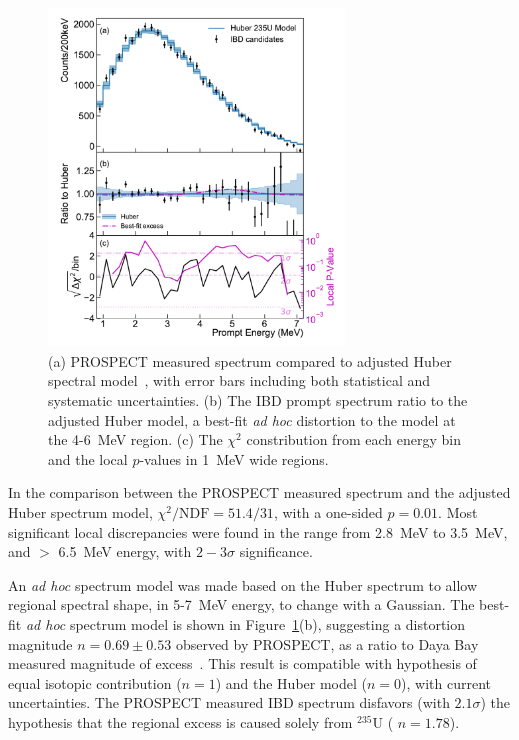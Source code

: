 \begin{figure}[h!]
    \centering
    \includegraphics[width=0.7\textwidth]{Figures/CombinedComparison.pdf}
    \caption[PROSPECT measured spectrum compared to adjusted Huber spectral model]{
    (a) PROSPECT measured spectrum compared to adjusted Huber spectral model~\cite{bib:prospect_spec}, with error bars including both statistical and systematic uncertainties.
    (b) The IBD prompt spectrum ratio to the adjusted Huber model, a best-fit \textit{ad hoc} distortion to the model at the 4-6~MeV region.
    (c) The $\chi^2$ constribution from each energy bin and the local $p$-values in 1~MeV wide regions.}
    \label{fig:modelcompare}
\end{figure}

In the comparison between the PROSPECT measured spectrum and the  adjusted Huber spectrum model, $\chi^2/\mathrm{NDF} = 51.4/31$, with a one-sided $p = 0.01$.
Most significant local discrepancies were found in the range from 2.8~MeV to 3.5~MeV, and $>$ 6.5~MeV energy, with $2-3\sigma$ significance.

An \textit{ad hoc} spectrum model was made based on the Huber spectrum to allow regional spectral shape, in 5-7~MeV \nuebar energy, to change with a Gaussian.
The best-fit \textit{ad hoc} spectrum model is shown in Figure~\ref{fig:modelcompare}(b), suggesting a distortion magnitude $n = 0.69\pm0.53$ observed by PROSPECT, as a ratio to Daya Bay measured magnitude of excess~\cite{bib:DYBSpectrum}.
This result is compatible with hypothesis of equal isotopic contribution ($n = 1$) and the Huber model ($n = 0$), with current uncertainties.
The PROSPECT measured IBD spectrum disfavors (with $2.1\sigma$) the hypothesis that the regional excess is caused solely from $^{235}$U ( $n = 1.78$). 


